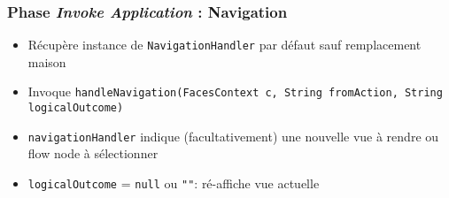 \documentclass[english, french]{beamer}
\begin{document}
\begin{frame}[label=ph-ian-details]
	\frametitle{Phase \emph{Invoke Application} : Navigation}
	\begin{itemize}
		\item Récupère instance de \texttt{NavigationHandler} par défaut {\tiny sauf remplacement maison}
		\item Invoque \texttt{handleNavigation(FacesContext c, String fromAction, String logicalOutcome)}
		\item \texttt{navigationHandler} indique (facultativement) une nouvelle vue à rendre {\tiny ou flow node à sélectionner}
		\item \texttt{logicalOutcome} = \texttt{null} ou \texttt{""}: ré-affiche vue actuelle
	\end{itemize}
\end{frame}
\end{document}
